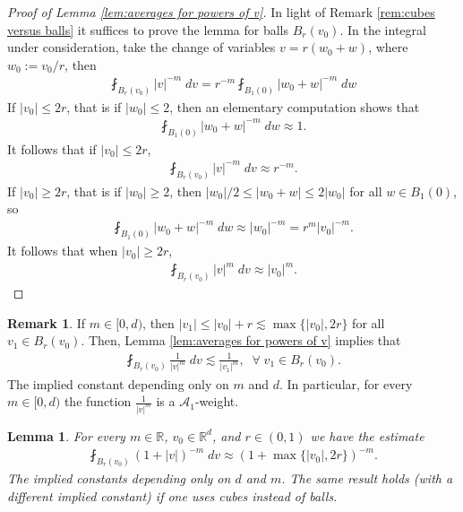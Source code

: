 \documentclass[12pt,american]{amsart}
\numberwithin{equation}{section}
\theoremstyle{plain}
\newtheorem{lem}[thm]{Lemma}
\theoremstyle{definition}                  %
\newtheorem{rem}[thm]{Remark}
\begin{document}
\begin{proof}[Proof of Lemma \ref{lem:averages for powers of v}]
  In light of Remark \ref{rem:cubes versus balls} it suffices to prove the lemma for balls $B_r(v_0)$. In the integral under consideration, take the change of variables $v=r(w_0+w)$, where $w_0 := v_0/r$, then
  \begin{align*}
    \fint_{B_{r}(v_0)}|v|^{-m}\;dv = r^{-m}\fint_{B_1(0)}|w_0+w|^{-m}\;dw
  \end{align*}
  If $|v_0|\leq 2r$, that is if $|w_0|\leq 2$, then an elementary computation shows that
  \begin{align*}
    \fint_{B_1(0)}|w_0+w|^{-m}\;dw \approx 1.
  \end{align*}
  It follows that if $|v_0|\leq 2r$,
  \begin{align*}
    \fint_{B_{r}(v_0)}|v|^{-m}\;dv \approx r^{-m}.
  \end{align*}  
  If $|v_0|\geq 2r$, that is if $|w_0|\geq 2$, then $|w_0|/2\leq |w_0+w|\leq 2|w_0|$ for all $w\in B_1(0)$, so
  \begin{align*}
    \fint_{B_1(0)}|w_0+w|^{-m}\;dw \approx |w_0|^{-m} = r^{m}|v_0|^{-m}.
  \end{align*}
  It follows that when $|v_0|\geq 2r$,
  \begin{align*}
    \fint_{B_{r}(v_0)}|v|^m\;dv \approx |v_0|^{m}.
  \end{align*}	
\end{proof}

\begin{rem} \label{rem:averages for powers of v}
  If $m\in [0,d)$, then $|v_1|\leq |v_0|+r\lesssim \max\{|v_0|,2r\}$ for all $v_1\in B_r(v_0)$. Then, Lemma \ref{lem:averages for powers of v} implies that
  \begin{align*}
    \fint_{B_r(v_0)}\frac{1}{|v|^m}\;dv \lesssim \frac{1}{|v_1|^m},\;\;\forall\;v_1\in B_r(v_0).
  \end{align*}
  The implied constant depending only on $m$ and $d$. In particular, for every $m\in [0,d)$ the function $\frac{1}{|v|^{m}}$ is a $\mathcal{A}_1$-weight. 
\end{rem}


\begin{lem}\label{lem:averages for powers of bracket v}
  For every $m \in \mathbb{R}$, $v_0 \in \mathbb{R}^d$, and $r\in(0,1)$ we have the estimate
  \begin{align*}
    \fint_{B_r(v_0)}(1+|v|)^{-m}\;dv \approx (1+\max\{|v_0|,2r\})^{-m}.
  \end{align*}
 The implied constants depending only on $d$ and $m$. The same result holds (with a different implied constant) if one uses cubes instead of balls.
\end{lem}
\end{document}
